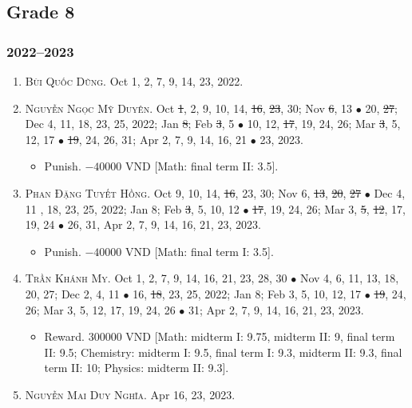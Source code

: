 \documentclass{article}
\begin{document}

\subsection{Grade 8}

\subsubsection{2022--2023}

\begin{enumerate}
	\item \textsc{Bùi Quốc Dũng.} {\sf[In]} Oct 1, 2, 7, 9, 14, 23, 2022. {\sf[Out]}
	\item \textsc{Nguyễn Ngọc Mỹ Duyên.} {\sf[In]} Oct \st{1}, 2, 9, 10, 14, \st{16}, \st{23}, 30; Nov \st{6}, 13 $\bullet$ 20, \st{27}; Dec 4, 11, 18, 23, 25, 2022; Jan \st{8}; Feb \st{3}, 5 $\bullet$ 10, 12, \st{17}, 19, 24, 26; Mar \st{3}, 5, 12, 17 $\bullet$ \st{19}, 24, 26, 31; Apr 2, 7, 9, 14, 16, 21 $\bullet$ 23, 2023.
	\begin{itemize}
		\item {\sf Punish.} $-40000$ VND [Math: final term II: 3.5].
	\end{itemize}
	\item \textsc{Phan Đặng Tuyết Hồng.} {\sf[In]} Oct 9, 10, 14, \st{16}, 23, 30; Nov 6, \st{13}, \st{20}, \st{27} $\bullet$ Dec 4, 11 , 18, 23, 25, 2022; Jan 8; Feb \st{3}, 5, 10, 12 $\bullet$ \st{17}, 19, 24, 26; Mar 3, \st{5}, \st{12}, 17, 19, 24 $\bullet$ 26, 31, Apr 2, 7, 9, 14, 16, 21, 23, 2023.
	\begin{itemize}
		\item {\sf Punish.} $-40000$ VND [Math: final term I: 3.5].
	\end{itemize}
	\item \textsc{Trần Khánh My.} {\sf[In]} Oct 1, 2, 7, 9, 14, 16, 21, 23, 28, 30 $\bullet$ Nov 4, 6, 11, 13, 18, 20, 27; Dec 2, 4, 11 $\bullet$ 16, \st{18}, 23, 25, 2022; Jan 8; Feb 3, 5, 10, 12, 17 $\bullet$ \st{19}, 24, 26; Mar 3, 5, 12, 17, 19, 24, 26 $\bullet$ 31; Apr 2, 7, 9, 14, 16, 21, 23, 2023.
	\begin{itemize}
		\item {\sf Reward.} 300000 VND [Math: midterm I: 9.75, midterm II: 9, final term II: 9.5;  Chemistry: midterm I: 9.5, final term I: 9.3, midterm II: 9.3, final term II: 10; Physics: midterm II: 9.3].
	\end{itemize}
	\item \textsc{Nguyễn Mai Duy Nghĩa.} {\sf[In]} Apr 16, 23, 2023.

\end{enumerate}
\end{document}
